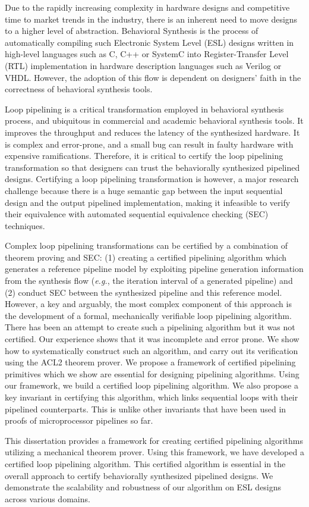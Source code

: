 Due to the rapidly increasing complexity in hardware designs and competitive time to market trends in the industry, there is an inherent need to move designs to a higher level of abstraction. Behavioral Synthesis is the process of automatically compiling such Electronic System Level (ESL) designs written in high-level languages such as C, C++ or SystemC into Register-Transfer Level (RTL) implementation in hardware description languages such as Verilog or VHDL. However, the adoption of this flow is dependent on designers' faith in the correctness of behavioral synthesis tools. 

Loop pipelining is a critical transformation employed in behavioral synthesis process, and ubiquitous in commercial and academic behavioral synthesis tools. It improves the throughput and reduces the latency of the synthesized hardware. It is complex and error-prone, and a small bug can result in faulty hardware with expensive ramifications. Therefore, it is critical to certify the loop pipelining transformation so that designers can trust the behaviorally synthesized pipelined designs.
Certifying a loop pipelining transformation is however, a major research challenge
because there is a huge semantic gap between the input sequential design and the output pipelined implementation, making it infeasible to verify their equivalence with automated sequential equivalence checking (SEC) techniques.

Complex loop pipelining transformations can be certified by a combination of theorem proving and SEC: (1) creating a certified pipelining algorithm which generates a reference pipeline model by exploiting pipeline generation information from the synthesis flow ({\em e.g.}, the iteration interval of a generated pipeline) and (2) conduct SEC between the synthesized pipeline and this reference model. However, a key and arguably, the most complex component of this approach is the development of a formal, mechanically verifiable loop pipelining algorithm. There has been an attempt to create such a pipelining algorithm but it was not certified. Our experience shows that it was incomplete and error prone. We show how to systematically construct such an algorithm, and carry out its verification using the ACL2 theorem prover. We propose a framework of certified pipelining primitives which we show are essential for designing pipelining algorithms. Using our framework, we build a certified loop pipelining algorithm. We also propose a key invariant in certifying this algorithm, which links sequential loops with their pipelined counterparts. This is unlike other invariants that have been used in proofs of microprocessor pipelines so far.

This dissertation provides a framework for creating certified pipelining algorithms utilizing a mechanical theorem prover. Using this framework, we have developed a certified loop pipelining algorithm. This certified algorithm is essential in the overall approach to certify behaviorally synthesized pipelined designs. We demonstrate the scalability and robustness of our algorithm on ESL designs across various domains. 
